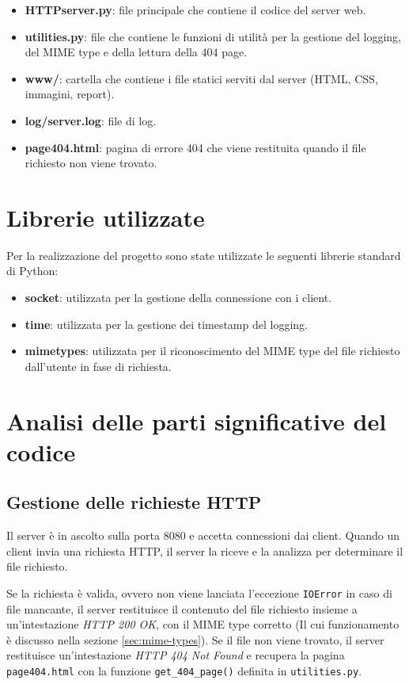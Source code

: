 \documentclass[a4paper,12pt]{report}
\begin{document}
\begin{itemize}
  \item \textbf{HTTPserver.py}: file principale che contiene il codice del server web.
  \item \textbf{utilities.py}: file che contiene le funzioni di utilità per la gestione del logging, del MIME type e della lettura della 404 page.
  \item \textbf{www/}: cartella che contiene i file statici serviti dal server (HTML, CSS, immagini, report).
  \item \textbf{log/server.log}: file di log.
  \item \textbf{page404.html}: pagina di errore 404 che viene restituita quando il file richiesto non viene trovato.
\end{itemize}

\section{Librerie utilizzate}
Per la realizzazione del progetto sono state utilizzate le seguenti librerie standard di Python:
\begin{itemize}
    \item \textbf{socket}: utilizzata per la gestione della connessione con i client.
    \item \textbf{time}: utilizzata per la gestione dei timestamp del logging.
    \item \textbf{mimetypes}: utilizzata per il riconoscimento del MIME type del file richiesto dall'utente in fase di richiesta.
\end{itemize}

\section{Analisi delle parti significative del codice}
\subsection{Gestione delle richieste HTTP}
\label{sec:gestione-richieste-http}
Il server è in ascolto sulla porta 8080 e accetta connessioni dai client. Quando un client invia una richiesta HTTP, il server la riceve e la analizza per determinare il file richiesto.

Se la richiesta è valida, ovvero non viene lanciata l'eccezione \texttt{IOError} in caso di file mancante, il server restituisce il contenuto del file richiesto insieme a un'intestazione \textit{HTTP 200 OK}, con il MIME type corretto (Il cui funzionamento è discusso nella sezione \ref{sec:mime-types}). Se il file non viene trovato, il server restituisce un'intestazione \textit{HTTP 404 Not Found} e recupera la pagina \texttt{page404.html} con la funzione \texttt{get\_404\_page()} definita in \texttt{utilities.py}.
\end{document}
